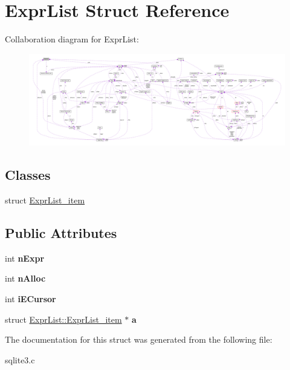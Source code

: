 \hypertarget{struct_expr_list}{\section{Expr\-List Struct Reference}
\label{struct_expr_list}
}


Collaboration diagram for Expr\-List\-:\nopagebreak
\begin{figure}[H]
\begin{center}
\leavevmode
\includegraphics[width=350pt]{struct_expr_list__coll__graph}
\end{center}
\end{figure}
\subsection*{Classes}
\begin{DoxyCompactItemize}
\item 
struct \hyperlink{struct_expr_list_1_1_expr_list__item}{Expr\-List\-\_\-item}
\end{DoxyCompactItemize}
\subsection*{Public Attributes}
\begin{DoxyCompactItemize}
\item 
\hypertarget{struct_expr_list_a88bdbd62cce306124eea63ae9f80ec33}{int {\bfseries n\-Expr}}\label{struct_expr_list_a88bdbd62cce306124eea63ae9f80ec33}

\item 
\hypertarget{struct_expr_list_a7e087b481e164f2b7e90fe81f0fa6c23}{int {\bfseries n\-Alloc}}\label{struct_expr_list_a7e087b481e164f2b7e90fe81f0fa6c23}

\item 
\hypertarget{struct_expr_list_aab870b9af60d25992f8672331d951ca0}{int {\bfseries i\-E\-Cursor}}\label{struct_expr_list_aab870b9af60d25992f8672331d951ca0}

\item 
\hypertarget{struct_expr_list_a02a4222d2dc4da64dcec416188abc16c}{struct \hyperlink{struct_expr_list_1_1_expr_list__item}{Expr\-List\-::\-Expr\-List\-\_\-item} $\ast$ {\bfseries a}}\label{struct_expr_list_a02a4222d2dc4da64dcec416188abc16c}

\end{DoxyCompactItemize}


The documentation for this struct was generated from the following file\-:\begin{DoxyCompactItemize}
\item 
sqlite3.\-c\end{DoxyCompactItemize}
